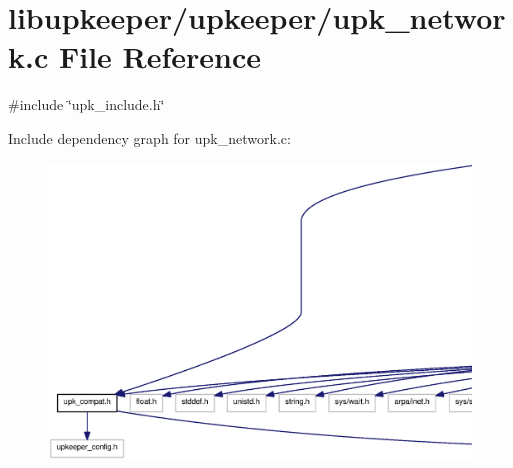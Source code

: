 \section{libupkeeper/upkeeper/upk\_\-network.c File Reference}
\label{upk__network_8c}
{\ttfamily \#include \char`\"{}upk\_\-include.h\char`\"{}}\par
Include dependency graph for upk\_\-network.c:
\nopagebreak
\begin{figure}[H]
\begin{center}
\leavevmode
\includegraphics[width=400pt]{upk__network_8c__incl}
\end{center}
\end{figure}
